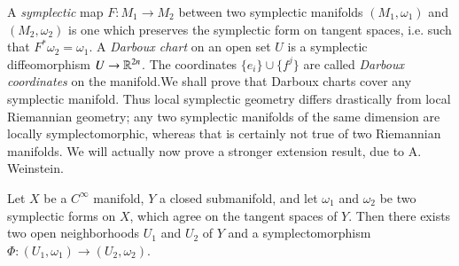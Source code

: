 A \emph{symplectic} map $F: M_1 \to M_2$ between two symplectic manifolds $(M_1,\omega_1)$ and $(M_2,\omega_2)$ is one which preserves the symplectic form on tangent spaces, i.e. such that $F^* \omega_2 = \omega_1$. A \emph{Darboux chart} on an open set $U$ is a symplectic diffeomorphism $U \to \operatorname{\mathbb{R}}^{2n}$. The coordinates $\{ e_i \} \cup \{ f^j \}$ are called \emph{Darboux coordinates} on the manifold.We shall prove that Darboux charts cover any symplectic manifold. Thus local symplectic geometry differs drastically from local Riemannian geometry; any two symplectic manifolds of the same dimension are locally symplectomorphic, whereas that is certainly not true of two Riemannian manifolds. We will actually now prove a stronger extension result, due to A. Weinstein.

\begin{theorem}
    Let $X$ be a $C^\infty$ manifold, $Y$ a closed submanifold, and let $\omega_1$ and $\omega_2$ be two symplectic forms on $X$, which agree on the tangent spaces of $Y$. Then there exists two open neighborhoods $U_1$ and $U_2$ of $Y$ and a symplectomorphism $\Phi: (U_1,\omega_1) \to (U_2,\omega_2)$.
\end{theorem}
